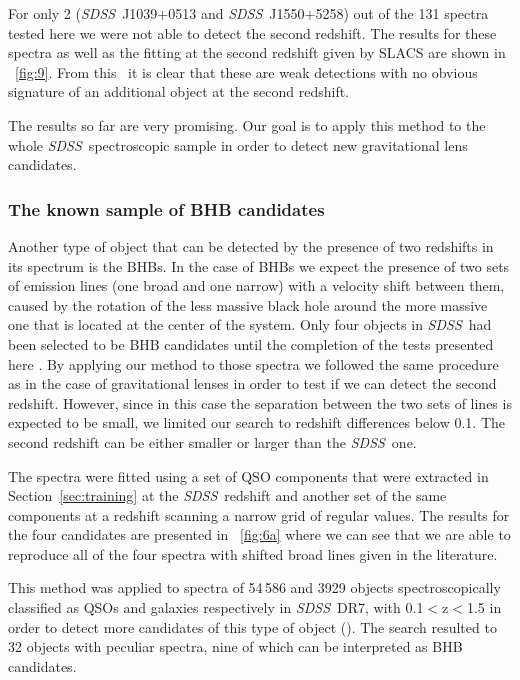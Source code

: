 \documentclass[12pt,preprint]{aastex}
\newcommand{\project}[1]{\textsl{#1}}
\newcommand{\sdss}{\project{SDSS}}
\newcommand{\SDSS}{\sdss}
\newcommand{\sectionname}{Section}
\begin{document}
For only 2  (\SDSS\ J1039+0513 and \SDSS\ J1550+5258) out of the 131 spectra 
tested here we were not able to detect the second redshift. The results for these spectra as well as
the fitting at the second redshift given by SLACS are shown in
\figurename~\ref{fig:9}. From this \figurename\ it is clear that these are
weak detections with no obvious signature of an additional object at
the second redshift.

The results so far are very promising. Our goal is to apply this method to the
whole \SDSS\ spectroscopic sample in order to detect new gravitational
lens candidates.

\subsubsection{The known sample of BHB candidates}
Another type of object that can be detected by the presence of two
redshifts in its spectrum is the BHBs. In the case of BHBs we
expect the presence of two sets of emission lines (one broad and one
narrow) with a velocity shift between them, caused by the rotation
of the less massive black hole around the more massive one that is
located at the center of the system. Only four objects in \SDSS\ had
been selected to be BHB candidates until the completion of the 
tests presented here
\citep{komossa,bogdanovic09,dotti09,boroson,shields,decarli}. By applying our
method to those spectra we followed the same procedure as in the case
of gravitational lenses in order to test if we can detect the second
redshift. However, since in this case the separation between the two
sets of lines is expected to be small, we limited our search to
redshift differences below 0.1. The second redshift can be either 
smaller or larger than the \SDSS\ one.

The spectra were fitted using a set of QSO components that were
extracted in \sectionname~\ref{sec:training} at the \SDSS\ 
redshift and another set of the same components at a redshift scanning a
narrow grid of regular values. The results for the four candidates are
presented in \figurename~\ref{fig:6a} where we can see that we are
able to reproduce all of the four spectra with shifted broad lines given 
in the literature.

This method was applied to spectra of 54\,586 and 3929 objects
spectroscopically classified as QSOs and galaxies respectively in \SDSS\ 
DR7, with 0.1$<$z$<$1.5 in order to detect more candidates of this
type of object (\citealt{tsalmantza}). The search resulted to 32
objects with peculiar spectra, nine of which can be interpreted as BHB
candidates.
\end{document}
